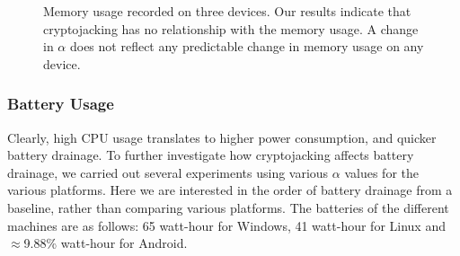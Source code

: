 \documentclass[acmlarge]{acmart}
\newcommand{\vs}[1]{{\vspace{-#1mm}}}
\newcommand{\cj}{cryptojacking\xspace}
\begin{document}
\begin{figure}[]
\centering
\vspace{-3mm}
\caption{Memory usage recorded on three devices. Our results indicate that \cj has no relationship with the memory usage. A change in $\alpha$ does not reflect any predictable change in memory usage on any device. }\vs{0}
\label{expriment:memory}
\end{figure}





\subsubsection{Battery Usage} Clearly, high CPU usage translates to higher power consumption, and quicker battery drainage. To further investigate how \cj affects battery drainage, we carried out several experiments using various $\alpha$ values for the various platforms. Here we are interested in the order of battery drainage from a baseline, rather than comparing various platforms. The batteries of the different machines are as follows: 65 watt-hour for Windows, 41 watt-hour for Linux and $\approx$9.88\% watt-hour for Android. 
\end{document}
